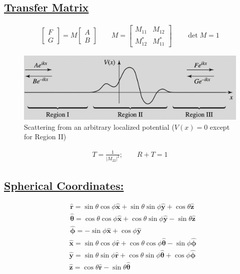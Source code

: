 \documentclass[a4paper,12pt]{article}
\begin{document}
\subsection*{\underline{Transfer Matrix}} %
\label{sub:Transfer Matrix}
\begin{align}
    \begin{bmatrix}
        F \\ G
    \end{bmatrix} = M \begin{bmatrix}
        A \\ B
    \end{bmatrix} \qquad
    M = \begin{bmatrix}
        M_{11}   & M_{12}   \\ 
        M^*_{12} & M^*_{11}
    \end{bmatrix} \qquad
    \det{M} = 1
\end{align}
\begin{figure}
    \includegraphics[width=1\linewidth]{arbitrary_V.png}
    \caption{Scattering from an arbitrary localized potential ($V(x)=0$ except for Region II)}
    \label{fig:arbitrary localized potential}
\end{figure}
\begin{align}
    T = \frac{1}{|M_{22}|^2}; \qquad R+T = 1
\end{align}

\newpage
\subsection*{\underline{Spherical Coordinates:}}
$$
    \begin{aligned}
         & \hat{\mathbf{r}}=\sin \theta \cos \phi \hat{\mathbf{x}}+\sin \theta \sin \phi \hat{\mathbf{y}}+\cos \theta \hat{\mathbf{z}}          \\
         & \hat{\boldsymbol{\theta}}=\cos \theta \cos \phi \hat{\mathbf{x}}+\cos \theta \sin \phi \hat{\mathbf{y}}-\sin \theta \hat{\mathbf{z}} \\
         & \hat{\boldsymbol{\phi}}=-\sin \phi \hat{\mathbf{x}}+\cos \phi \hat{\mathbf{y}}
    \end{aligned}
$$
$$
    \begin{aligned}
         & \hat{\mathbf{x}}=\sin \theta \cos \phi \hat{\mathbf{r}}+\cos \theta \cos \phi \hat{\boldsymbol{\theta}}-\sin \phi \hat{\boldsymbol{\phi}} \\
         & \hat{\mathbf{y}}=\sin \theta \sin \phi \hat{\mathbf{r}}+\cos \theta \sin \phi \hat{\boldsymbol{\theta}}+\cos \phi \hat{\boldsymbol{\phi}} \\
         & \hat{\mathbf{z}}=\cos \theta \hat{\mathbf{r}}-\sin \theta \hat{\boldsymbol{\theta}}
    \end{aligned}
$$
\end{document}
